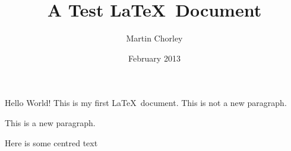 \documentclass[12pt,twoside,a4paper]{article}
\title{A Test \LaTeX\ Document}
\author{Martin Chorley}
\date{February 2013}
\begin{document}
\maketitle

\begin{abstract}
\lipsum[2]
\end{abstract}

Hello World! This is       my       first       \LaTeX\     document.
This is not a new paragraph.

This is a new paragraph.
\begin{center}Here is some centred text\end{center}

\lipsum
\end{document}
